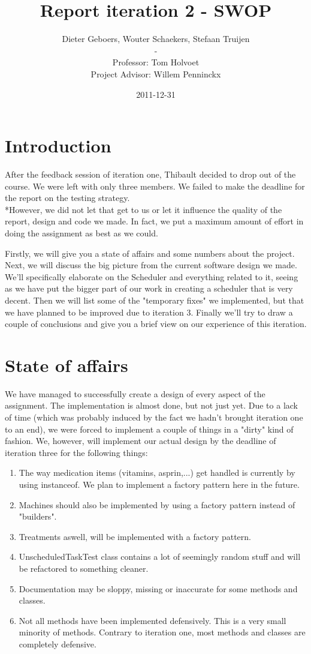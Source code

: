 \documentclass[11pt]{article}
\title{Report iteration 2 - SWOP}
\author{Dieter Geboers, Wouter Schaekers, Stefaan Truijen\\ - \\ Professor: Tom Holvoet \\ Project Advisor: Willem Penninckx}
\date{2011-12-31}
\begin{document}
\maketitle

\section{Introduction}
After the feedback session of iteration one, Thibault decided to drop out of the course. We were left with only three members. We failed to make the deadline for the report on the testing strategy.
\\*However, we did not let that get to us or let it influence the quality of the report, design and code we made. In fact, we put a maximum amount of effort in doing the assignment as best as we could.\newline

Firstly, we will give you a state of affairs and some numbers about the project. Next, we will discuss the big picture from the current software design we made. We'll specifically elaborate on the Scheduler and everything related to it, seeing as we have put the bigger part of our work in creating a scheduler that is very decent. Then we will list some of the "temporary fixes" we implemented, but that we have planned to be improved due to iteration 3. Finally we'll try to draw a couple of conclusions and give you a brief view on our experience of this iteration.
\pagebreak
\tableofcontents
\pagebreak

\section{State of affairs}
We have managed to successfully create a design of every aspect of the assignment. The implementation is almost done, but not just yet. Due to a lack of time (which was probably induced by the fact we hadn't brought iteration one to an end), we were forced to implement a couple of things in a "dirty" kind of fashion. We, however, will implement our actual design by the deadline of iteration three for the following things:
\begin{enumerate}
\item{The way medication items (vitamins, asprin,...) get handled is currently by using instanceof. We plan to implement a factory pattern here in the future.}
\item{Machines should also be implemented by using a factory pattern instead of "builders".}
\item{Treatments aswell, will be implemented with a factory pattern.}
\item{UnscheduledTaskTest class contains a lot of seemingly random stuff and will be refactored to something cleaner.}
\item{Documentation may be sloppy, missing or inaccurate for some methods and classes.}
\item{Not all methods have been implemented defensively. This is a very small minority of methods. Contrary to iteration one, most methods and classes are completely defensive.}
\end{enumerate}
\end{document}
